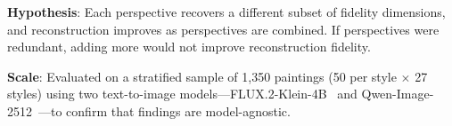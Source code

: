 \textbf{Hypothesis}: Each perspective recovers a different subset of fidelity dimensions, and reconstruction improves as perspectives are combined.
If perspectives were redundant, adding more would not improve reconstruction fidelity.

\textbf{Scale}: Evaluated on a stratified sample of 1,350 paintings (50 per style $\times$ 27 styles) using two text-to-image models---FLUX.2-Klein-4B~\cite{flux2} and Qwen-Image-2512~\cite{wu2025qwenimage}---to confirm that findings are model-agnostic.

